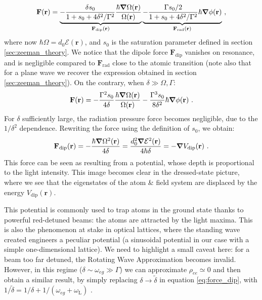 \documentclass[11pt]{article}
\newcommand{\mathsc}[1]{\mathrm{\scriptscriptstyle {#1}}}
\numberwithin{equation}{section}
\numberwithin{figure}{section}
\begin{document}
%
\begin{equation}
	\mathbf{F}(\mathbf{r}) =\underbrace{ -\frac{\delta s_0}{1+s_0 + 4 \delta^2 / \Gamma^2} \frac{\hbar\grad \Omega(\mathbf{r})}{\Omega(\mathbf{r})}}_{\mathbf{F}_\text{dip}(\mathbf{r})} \underbrace{- \frac{\Gamma s_0/2}{1+s_0+ 4 \delta^2 / \Gamma^2} \hbar \grad \phi(\mathbf{r})}_{\mathbf{F_\text{rad}(\mathbf{r})}}~,
\end{equation}
%
where now $\hbar \Omega = d_0 \mathcal{E}(\mathbf{r})$, and $s_0$ is the saturation parameter defined in section \ref{sec:zeeman_theory}. We notice that the dipole force $\mathbf{F}_\text{dip}$ vanishes on resonance, and is negligible compared to $\mathbf{F}_\text{rad}$ close to the atomic transition (note also that for a plane wave we recover the expression obtained in section \ref{sec:zeeman_theory}). On the contrary, when $\delta \gg \Omega, \Gamma$:
%
\begin{equation}
	\mathbf{F}(\mathbf{r}) = - \frac{\Gamma^2 s_0}{4 \delta} \frac{\hbar\grad \Omega(\mathbf{r})}{\Omega(\mathbf{r})} - \frac{\Gamma^3 s_0}{8 \delta^2}  \hbar \grad \phi(\mathbf{r})~.
\end{equation}
%
For $\delta$ sufficiently large, the radiation pressure force becomes negligible, due to the $1/\delta^2$ dependence. Rewriting the force using the definition of $s_0$, we obtain:
%
\begin{equation}
	\label{eq:force_dip}
	\mathbf{F}_\text{dip}(\mathbf{r}) = - \frac{\hbar \grad \Omega^2(\mathbf{r})}{4 \delta} = \frac{d_0^2 \grad \mathcal{E}^2(\mathbf{r})}{4 \hbar \delta}= - \grad V_\text{dip}(\mathbf{r})~.
\end{equation}
%
This force can be seen as resulting from a potential, whose depth is proportional to the light intensity. This image becomes clear in the dressed-state picture, where we see that the eigenstates of the atom \& field system are displaced by the energy $V_\text{dip}(\mathbf{r})$. 

This potential is commonly used to trap atoms in the ground state thanks to powerful red-detuned beams: the atoms are attracted by the light maxima. This is also the phenomenon at stake in optical lattices, where the standing wave created engineers a peculiar potential (a sinusoidal potential in our case with a simple one-dimensional lattice). We need to highlight a small caveat here: for a beam too far detuned, the Rotating Wave Approximation becomes invalid. However, in this regime ($\delta \sim \omega_{eg} \gg \Gamma$) we can approximate $\rho_{ee} \simeq 0$ and then obtain a similar result, by simply replacing $\delta \rightarrow \tilde{\delta}$ in equation \eqref{eq:force_dip}, with $1/ \tilde{\delta} = 1 / \delta + 1 / (\omega_{eg} + \omega_\mathsc{L})$ \citep{2000_grimm}. \\
\end{document}
